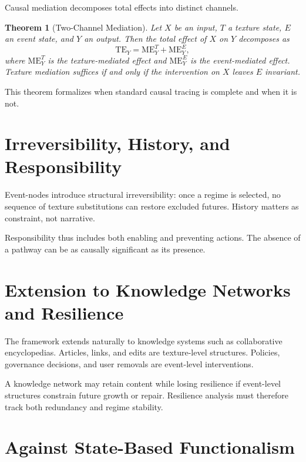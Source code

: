 \documentclass[11pt]{article}
\newtheorem{theorem}{Theorem}
\theoremstyle{remark}
\begin{document}
Causal mediation decomposes total effects into distinct channels.

\begin{theorem}[Two-Channel Mediation]
Let $X$ be an input, $T$ a texture state, $E$ an event state, and $Y$ an output. Then the total effect of $X$ on $Y$ decomposes as
\[
\mathrm{TE}_Y = \mathrm{ME}^T_Y + \mathrm{ME}^E_Y,
\]
where $\mathrm{ME}^T_Y$ is the texture-mediated effect and $\mathrm{ME}^E_Y$ is the event-mediated effect. Texture mediation suffices if and only if the intervention on $X$ leaves $E$ invariant.
\end{theorem}

This theorem formalizes when standard causal tracing is complete and when it is not.

\section{Irreversibility, History, and Responsibility}

Event-nodes introduce structural irreversibility: once a regime is selected, no sequence of texture substitutions can restore excluded futures. History matters as constraint, not narrative.

Responsibility thus includes both enabling and preventing actions. The absence of a pathway can be as causally significant as its presence.

\section{Extension to Knowledge Networks and Resilience}

The framework extends naturally to knowledge systems such as collaborative encyclopedias. Articles, links, and edits are texture-level structures. Policies, governance decisions, and user removals are event-level interventions.

A knowledge network may retain content while losing resilience if event-level structures constrain future growth or repair. Resilience analysis must therefore track both redundancy and regime stability.

\section{Against State-Based Functionalism}
\end{document}
